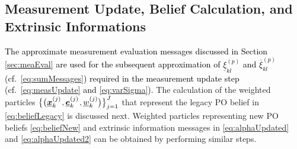 \documentclass[10pt, twoside, romanappendices]{IEEEtran}
\providecommand{\rd}{\textcolor{black}}
\providecommand{\ist}{\hspace*{.3mm}}
\begin{document}
 
\subsection{Measurement Update, Belief Calculation, and Extrinsic Informations}
\label{sec:measurementUpdate}

\vspace{.4mm}

\rd{The approximate measurement \vspace{.3mm} evaluation messages discussed in Section \ref{sec:meaEval} are used for the \vspace{-.2mm} subsequent approximation of $\underline{\xi}_{kl}^{(p)}$ and $\overline{\xi}_{kl}^{(p)}$ (cf.~\eqref{eq:sumMessages}) required in the measurement \vspace{.1mm} update step (cf.~\eqref{eq:measUpdate} and \eqref{eq:varSigma}).}
The calculation of the weighted particles  $\big\{ \big( \underline{\V{x}}^{(j)}_{k} \ist, \underline{\V{e}}^{(j)}_{k} \ist, \underline{w}^{(j)}_{k} \big) \big\}_{j=1}^{J}$ that represent the legacy PO belief in \eqref{eq:beliefLegacy} is discussed next. Weighted particles representing new PO beliefs  \eqref{eq:beliefNew} and extrinsic information messages in \eqref{eq:alphaUpdated} and \eqref{eq:alphaUpdated2} can be obtained by performing similar steps. 
\end{document}

